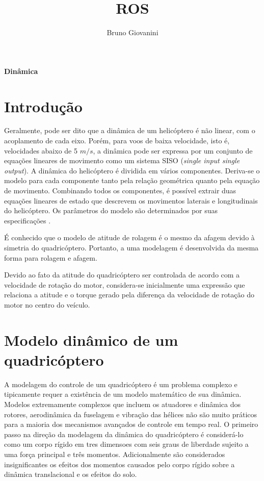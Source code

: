 \documentclass[a4paper, 12pt]{article}
\author{Bruno Giovanini}
\title{ROS}
\begin{document}
\begin{large}


\textbf{Dinâmica}

\vspace{1.5cm}


\end{large}



\newpage


\section{Introdução}

Geralmente, pode ser dito que a dinâmica de um helicóptero é não linear, com o acoplamento de cada eixo. Porém, para voos de baixa velocidade, isto é, velocidades abaixo de 5 $m/s$, a dinâmica pode ser expressa por um conjunto de equações lineares de movimento como um sistema SISO (\textit{single input single output}). A dinâmica do helicóptero é dividida em vários componentes. Deriva-se o modelo para cada componente tanto pela relação geométrica quanto pela equação de movimento. Combinando todos os componentes, é possível extrair duas equações lineares de estado que descrevem os movimentos laterais e longitudinais do helicóptero. Os parâmetros do modelo são determinados por suas especificações \cite{Nonami2010}.

É conhecido que o modelo de atitude de rolagem é o mesmo da afagem devido à simetria do quadricóptero. Portanto, a uma modelagem é desenvolvida da mesma forma para rolagem e afagem.

Devido ao fato da atitude do quadricóptero ser controlada de acordo com a velocidade de rotação do motor, considera-se inicialmente uma expressão que relaciona a atitude e o torque gerado pela diferença da velocidade de rotação do motor no centro do veículo.




\section{Modelo dinâmico de um quadricóptero}

A modelagem do controle de um quadricóptero é um problema complexo e tipicamente requer a existência de um modelo matemático de sua dinâmica. Modelos extremamente complexos que incluem os atuadores e dinâmica dos rotores, aerodinâmica da fuselagem e vibração das hélices não são muito práticos para a maioria dos mecanismos avançados de controle em tempo real. O primeiro passo na direção da modelagem da dinâmica do quadricóptero é considerá-lo como um corpo rígido em tres dimensoes com seis graus de liberdade sujeito a uma força principal e três momentos. Adicionalmente são considerados insignificantes os efeitos dos momentos causados pelo corpo rígido sobre a dinâmica translacional e os efeitos do solo. 
\end{document}
